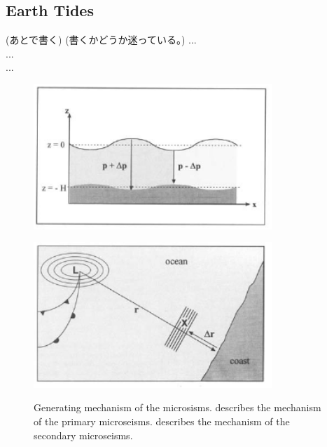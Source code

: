 \subsection{Earth Tides} \label{sec:314}
(あとで書く)
(書くかどうか迷っている。)
...\\
...\\
...\\

\begin{figure}[H]
  \begin{center}
    \begin{minipage}[b]{0.65\hsize}
      \centering
      \includegraphics[width=9.0cm]{./img_chap3/img311.png}
      \label{img:img311}
    \end{minipage}
    \begin{minipage}[b]{0.65\hsize}
      \centering      
      \includegraphics[width=9.0cm]{./img_chap3/img312.png}
      \label{img:img312}
    \end{minipage}
  \end{center}
  \caption{ Generating mechanism of the microsisms.  describes the mechanism of the primary microseisms.  describes the mechanism of the secondary microseisms.}
\end{figure}

